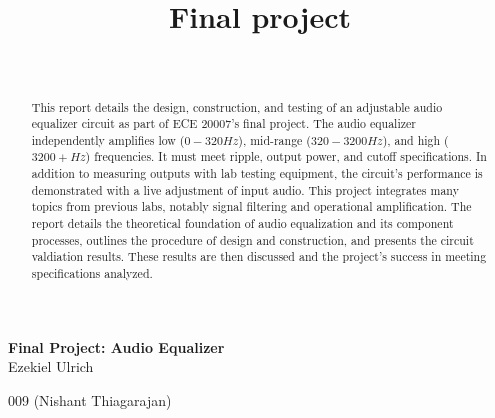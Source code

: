 \documentclass[notitlepage, 12pt]{report}
\title{Final project}
\begin{document}
\begin{center}
\Large \textbf{Final Project: Audio Equalizer} \\
\small 
Ezekiel Ulrich \\
\date\\
009 (Nishant Thiagarajan)\\
\end{center}
\vspace{4in}

\begin{abstract}
\noindent This report details the design, construction, and testing of an adjustable audio equalizer circuit as 
part of ECE 20007's final project. 
The audio equalizer independently amplifies low ($0-320 Hz$), 
mid-range ($320-3200 Hz$), and high ($3200+ Hz$) frequencies. It must meet ripple, output power, and cutoff specifications.
In addition to measuring outputs with lab testing equipment, the circuit's performance 
is demonstrated with a live adjustment of input audio.
This project integrates many topics from previous labs, 
notably signal filtering and operational amplification. The report 
details the theoretical foundation of audio equalization and its component 
processes, outlines the procedure of design and construction, and presents 
the circuit valdiation results. These results are then discussed and the 
project's success in meeting specifications analyzed.  
\end{abstract}

\newpage
\end{document}
